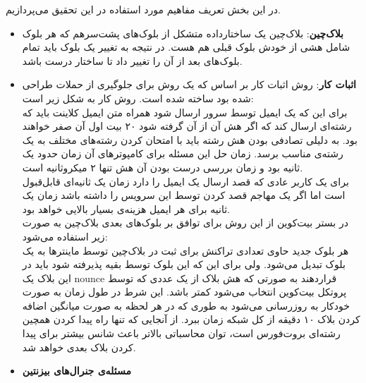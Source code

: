 \par
در این بخش تعریف مفاهیم مورد استفاده‌ در این تحقیق می‌پردازیم. 
\begin{itemize}
	\item 
	\textbf{بلاک‌چین}:
	بلاک‌چین یک ساختارداده متشکل‌ از بلوک‌های پشت‌‌سرهم که هر بلوک شامل هشی از خودش بلوک قبلی هم هست. در نتیجه به تغییر یک بلوک باید تمام بلوک‌‌های بعد از آن را تغییر داد تا ساختار درست باشد. 
	\item
	\textbf{اثبات کار}:
	روش اثبات کار بر اساس
	 که یک روش برای جلوگیری از حملات
	   طراحی شده بود ساخته شده است. روش کار 
	   به شکل زیر است:
	   \\
	   برای این که یک ایمیل توسط سرور ارسال شود همراه متن ایمیل کلاینت باید که رشته‌ای ارسال کند که اگر  هش 
	   آن از آن گرفته شود ۲۰ بیت اول آن صفر خواهند بود. به دلیلی تصادفی بودن هش رشته باید با امتحان کردن رشته‌‌های مختلف به یک رشته‌ی مناسب برسد. زمان حل این مسئله‌ برای کامپوتر‌های 
	   آن زمان حدود یک ثانیه بود و زمان بررسی درست بودن آن هش تنها ۲ میکروثانیه است.
	   \\
	   برای یک کاربر عادی که قصد ارسال یک ایمیل را دارد زمان یک‌ ثانیه‌ای قابل‌قبول است اما اگر یک مهاجم قصد 
	   کردن توسط این سرویس را داشته باشد زمان یک ثانیه برای هر ایمیل هزینه‌ی بسیار بالایی خواهد بود.
	   \\
	   در بستر بیت‌کوین از این روش برای توافق بر بلوک‌های بعدی بلاک‌چین به صورت زیر استفاده می‌شود:
	   \\
	هر بلوک جدید حاوی تعدادی تراکنش برای ثبت در بلاک‌چین توسط ماینترها به یک بلوک تبدیل می‌شود. ولی برای این که این بلوک توسط بقیه پذیرفته شود باید در این بلاک یک nounce قراردهند به صورتی که هش بلاک از یک عددی که توسط پروتکل بیت‌کوین انتخاب می‌شود کمتر باشد. این شرط در طول زمان به صورت خودکار به روزرسانی می‌شود به طوری که در هر لحظه به صورت میانگین اضافه کردن بلاک ۱۰ دقیقه از کل شبکه زمان ببرد. از آنجایی که تنها راه پیدا کردن همچین رشته‌ای بروت‌فورس است، توان محاسباتی بالاتر باعث شانس بیشتر برای پیدا کردن بلاک بعدی خواهد شد. 
	
	
	\item 
	
\textbf{مسئله‌ی جنرال‌های بیزنتین}


\end{itemize}
